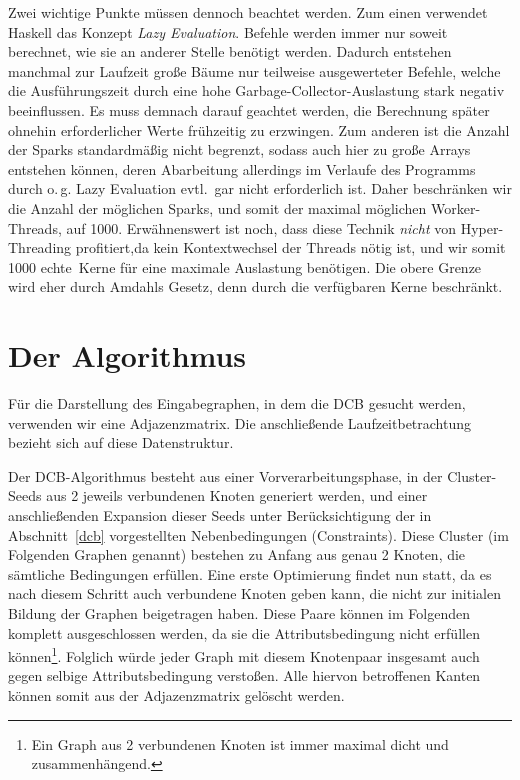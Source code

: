 \documentclass[a4paper]{scrartcl}
\newcommand{\en}[1]{\selectlanguage{USenglish}#1\selectlanguage{ngerman}}
\begin{document}
\medskip
Zwei wichtige Punkte müssen dennoch beachtet werden. Zum einen verwendet Haskell das Konzept \emph{\en{Lazy Evaluation}}. Befehle werden immer nur soweit berechnet, wie sie an anderer Stelle benötigt werden. Dadurch entstehen manchmal zur Laufzeit große Bäume nur teilweise ausgewerteter Befehle, welche die Ausführungszeit durch eine hohe Garbage-Collector-Auslastung stark negativ beeinflussen. Es muss demnach darauf geachtet werden, die Berechnung später ohnehin erforderlicher Werte frühzeitig zu erzwingen. Zum anderen ist die Anzahl der Sparks standardmäßig nicht begrenzt, sodass auch hier zu große Arrays entstehen können, deren Abarbeitung allerdings im Verlaufe des Programms durch o.\,g. Lazy Evaluation evtl.\ gar nicht erforderlich ist. Daher beschränken wir die Anzahl der möglichen Sparks, und somit der maximal möglichen Worker-Threads, auf 1000. Erwähnenswert ist noch, dass diese Technik \emph{nicht} von Hyper-Threading profitiert,da kein Kontextwechsel der Threads nötig ist, und wir somit 1000 \glqq echte\grqq \ Kerne für eine maximale Auslastung benötigen. Die obere Grenze wird eher durch Amdahls Gesetz, denn durch die verfügbaren Kerne beschränkt.\par


\section{Der Algorithmus}

Für die Darstellung des Eingabegraphen, in dem die DCB gesucht werden, verwenden wir eine Adjazenzmatrix. Die anschließende Laufzeitbetrachtung bezieht sich auf diese Datenstruktur. \par
Der DCB-Algorithmus besteht aus einer Vorverarbeitungsphase, in der Cluster-Seeds aus 2 jeweils verbundenen Knoten generiert werden, und einer anschließenden Expansion dieser Seeds unter Berücksichtigung der in Abschnitt~\ref{dcb} vorgestellten Nebenbedingungen (Constraints). Diese Cluster (im Folgenden Graphen genannt) bestehen zu Anfang aus genau 2 Knoten, die sämtliche Bedingungen erfüllen. Eine erste Optimierung findet nun statt, da es nach diesem Schritt auch verbundene Knoten geben kann, die nicht zur initialen Bildung der Graphen beigetragen haben. Diese Paare können im Folgenden komplett ausgeschlossen werden, da sie die Attributsbedingung nicht erfüllen können\footnote{Ein Graph aus 2 verbundenen Knoten ist immer maximal dicht und zusammenhängend.}. Folglich würde jeder Graph mit diesem Knotenpaar insgesamt auch gegen selbige Attributsbedingung verstoßen. Alle hiervon betroffenen Kanten können somit aus der Adjazenzmatrix gelöscht werden.\par
\end{document}
